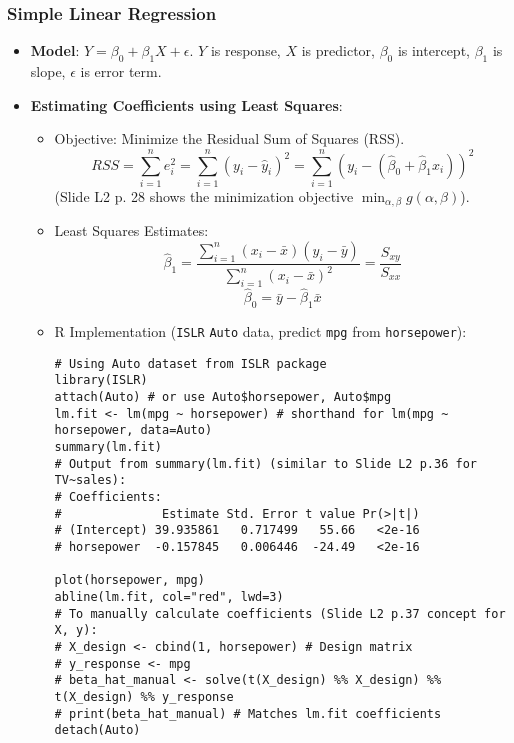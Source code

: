 \documentclass[12pt,a4paper]{article}
\newcommand{\Rpackage}[1]{\texttt{#1}} %
\newcommand{\Robject}[1]{\texttt{#1}} %
\begin{document}
\begin{itemize}
    \subsubsection{Simple Linear Regression }
        \begin{itemize}
            \item \textbf{Model}: $Y = \beta_0 + \beta_1 X + \epsilon$. $Y$ is response, $X$ is predictor, $\beta_0$ is intercept, $\beta_1$ is slope, $\epsilon$ is error term.
            \item \textbf{Estimating Coefficients using Least Squares}:
                \begin{itemize}
                    \item Objective: Minimize the Residual Sum of Squares (RSS).
                        $$ RSS = \sum_{i=1}^{n} e_i^2 = \sum_{i=1}^{n} (y_i - \hat{y}_i)^2 = \sum_{i=1}^{n} (y_i - (\hat{\beta}_0 + \hat{\beta}_1 x_i))^2 $$
                        (Slide L2 p. 28 shows the minimization objective $\min_{\alpha,\beta} g(\alpha, \beta)$).
                    \item Least Squares Estimates:
                        $$ \hat{\beta}_1 = \frac{\sum_{i=1}^{n} (x_i - \bar{x})(y_i - \bar{y})}{\sum_{i=1}^{n} (x_i - \bar{x})^2} = \frac{S_{xy}}{S_{xx}} $$
                        $$ \hat{\beta}_0 = \bar{y} - \hat{\beta}_1 \bar{x} $$
                    \item R Implementation (\Rpackage{ISLR} \Robject{Auto} data, predict \Robject{mpg} from \Robject{horsepower}):
\begin{lstlisting}[caption={Simple Linear Regression in R (ISLR Ch 3 Lab, Slides L2 p. 29, L2 p.36)}]
# Using Auto dataset from ISLR package
library(ISLR)
attach(Auto) # or use Auto$horsepower, Auto$mpg
lm.fit <- lm(mpg ~ horsepower) # shorthand for lm(mpg ~ horsepower, data=Auto)
summary(lm.fit)
# Output from summary(lm.fit) (similar to Slide L2 p.36 for TV~sales):
# Coefficients:
#              Estimate Std. Error t value Pr(>|t|)    
# (Intercept) 39.935861   0.717499   55.66   <2e-16 
# horsepower  -0.157845   0.006446  -24.49   <2e-16 

plot(horsepower, mpg)
abline(lm.fit, col="red", lwd=3)
# To manually calculate coefficients (Slide L2 p.37 concept for X, y):
# X_design <- cbind(1, horsepower) # Design matrix
# y_response <- mpg
# beta_hat_manual <- solve(t(X_design) %% X_design) %% t(X_design) %% y_response
# print(beta_hat_manual) # Matches lm.fit coefficients
detach(Auto)
\end{lstlisting}
                \end{itemize}
        \end{itemize}


\end{itemize}
\end{document}
